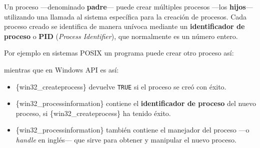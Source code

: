 Un proceso ---denominado \textbf{padre}--- puede crear múltiples
procesos ---los \textbf{hijos}--- utilizando una llamada al sistema
específica para la creación de procesos. Cada proceso creado se
identifica de manera unívoca mediante un \textbf{{}identificador de
proceso} o \textbf{{}PID} (\emph{Process Identifier}), que normalmente
es un número entero.

Por ejemplo en sistemas POSIX un programa puede crear otro proceso así:

\begin{Shaded}
\begin{Highlighting}[]
\OperatorTok{=}\OperatorTok{();}
\end{Highlighting}
\end{Shaded}

mientras que en Windows API es así:

\begin{Shaded}
\begin{Highlighting}[]
\OperatorTok{=} \OperatorTok{\{}\OperatorTok{\};}
 \OperatorTok{(}\OperatorTok{(} \SpecialCharTok{\textbackslash{}\textbackslash{}}\SpecialCharTok{\textbackslash{}\textbackslash{}}\SpecialCharTok{\textbackslash{}\textbackslash{}}\OperatorTok{,} \OperatorTok{,} \OperatorTok{\&}\OperatorTok{))} 
\OperatorTok{\{}
\OperatorTok{=}\OperatorTok{;} 
\OperatorTok{=}\OperatorTok{;} 
\OperatorTok{\}}
\end{Highlighting}
\end{Shaded}

\begin{itemize}
\item
  \{win32\_createprocess\} devuelve \texttt{TRUE} si el proceso se creó
  con éxito.
\item
  \{win32\_processinformation\} contiene el \textbf{identificador de
  proceso} del nuevo proceso, si \{win32\_createprocess\} ha tenido
  éxito.
\item
  \{win32\_processinformation\} también contiene el manejador del
  proceso ---o \emph{handle} en inglés--- que sirve para obtener y
  manipular el nuevo proceso.
\end{itemize}

